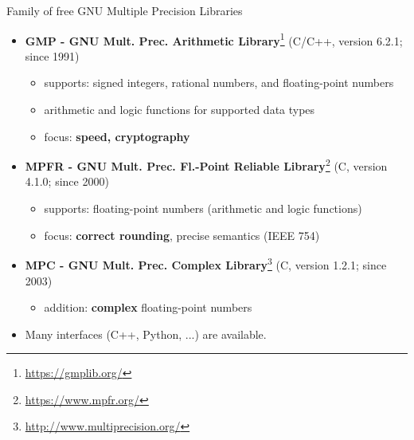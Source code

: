 \begin{frame}{Family of free GNU Multiple Precision Libraries}

\begin{itemize}\itemsep0.5em

\item
\textbf{GMP - GNU Mult. Prec. Arithmetic Library}\footnote{\tiny
\url{https://gmplib.org/}}
(C/C++, version 6.2.1; since 1991)
\begin{itemize}
\item
supports: signed integers, rational numbers, and floating-point numbers

\item
arithmetic and logic functions for supported data types

\item
focus: \textbf{speed, cryptography}
\end{itemize}

\item
\textbf{MPFR - GNU Mult. Prec. Fl.-Point Reliable Library}\footnote{\tiny
\url{https://www.mpfr.org/}}
(C, version 4.1.0; since 2000)
\begin{itemize}
\item
supports: floating-point numbers (arithmetic and logic functions)

\item
focus: \textbf{correct rounding}, precise semantics (IEEE 754)
\end{itemize}

\item
\textbf{MPC - GNU Mult. Prec. Complex Library}\footnote{\tiny
\url{http://www.multiprecision.org/}}
(C, version 1.2.1; since 2003)
\begin{itemize}
\item
addition: \textbf{complex} floating-point numbers
\end{itemize}

\bigskip

\item
Many interfaces (C++, Python, ...) are available.

\end{itemize}

\end{frame}



